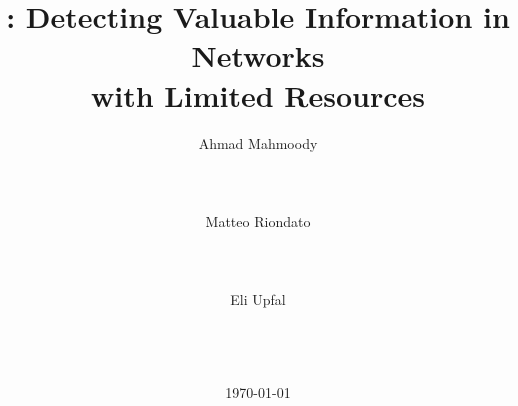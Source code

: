 \documentclass{sig-alternate-2013}
\newif\ifacmstyle
\begin{document}
\ifacmstyle
\newfont{\mycrnotice}{ptmr8t at 7pt}
\newfont{\myconfname}{ptmri8t at 7pt}
\let\crnotice\mycrnotice%
\let\confname\myconfname%


\CopyrightYear{2016}
\permission{Permission to make digital or hard copies of all or part of this
work for personal or classroom use is granted without fee provided that copies
are not made or distributed for profit or commercial advantage and that copies
bear this notice and the full citation on the first page. Copyrights for
components of this work owned by others than ACM must be honored. Abstracting
with credit is permitted. To copy otherwise, or republish, to post on servers or
to redistribute to lists, requires prior specific permission and/or a fee.
Request permissions from Permissions@acm.org.}
\conferenceinfo{WSDM'16,}{February 22--25, 2016, San Francisco, CA, USA}
\copyrightetc{\copyright~2016 ACM. ISBN \the\acmcopyr}
\crdata{XXX-X-XXXX-XXXX-X/16/02\ ...\$15.00.\\
DOI: http://dx.doi.org/XX.XXXX/XXXXXXX.XXXXXXX
}

\clubpenalty=10000
\widowpenalty = 10000
\fi

\title{\algonamebasecap: Detecting Valuable Information in Networks\\with Limited Resources}

\author{
\alignauthor
Ahmad Mahmoody\\
\\
\\
\\
\alignauthor
Matteo Riondato\\
\\
\\
\\
\alignauthor
Eli Upfal\\
\\
\\
\\
}

\date{\today}

\maketitle
\end{document}
